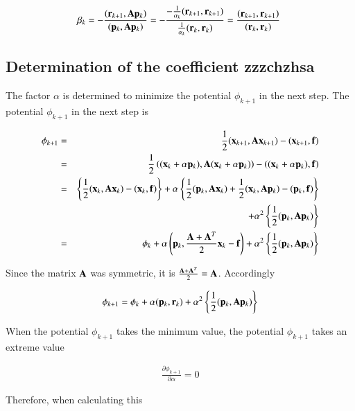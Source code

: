 \begin{equation}
\beta_k=-\frac{(\mathbf{r}_{k+1},\mathbf{A}\mathbf{p}_k)}{(\mathbf{p}_k,\mathbf{A}\mathbf{p}_k)}=-\frac{-\frac{1}{\alpha_k}(\mathbf{r}_{k+1},\mathbf{r}_{k+1})}{\frac{1}{\alpha_k}(\mathbf{r}_k,\mathbf{r}_k)}=\frac{(\mathbf{r}_{k+1},\mathbf{r}_{k+1})}{(\mathbf{r}_k,\mathbf{r}_k)}~
\end{equation}





\subsection{Determination of the coefficient zzzchzhsa}


The factor $\alpha$ is determined to minimize the potential $\phi_{k+1}$ in the next step.
The potential $\phi_{k+1}$ in the next step is

\begin{eqnarray}
\phi_{k+1} &=& \frac{1}{2}(\mathbf{x}_{k+1},\mathbf{A}\mathbf{x}_{k+1})-(\mathbf{x}_{k+1},\mathbf{f})\\
&=& \frac{1}{2}\left((\mathbf{x}_k+\alpha\mathbf{p}_k),\mathbf{A}(\mathbf{x}_k+\alpha\mathbf{p}_k)\right)-\left((\mathbf{x}_k+\alpha\mathbf{p}_k),\mathbf{f}\right)\\
&=& \left\{\frac{1}{2}(\mathbf{x}_k,\mathbf{A}\mathbf{x}_k)-(\mathbf{x}_k,\mathbf{f})\right\} + \alpha\left\{\frac{1}{2}(\mathbf{p}_k,\mathbf{A}\mathbf{x}_k)+\frac{1}{2}(\mathbf{x}_k,\mathbf{A}\mathbf{p}_k)-(\mathbf{p}_k,\mathbf{f})\right\}\\
&& + \alpha^2\left\{\frac{1}{2}(\mathbf{p}_k,\mathbf{A}\mathbf{p}_k)\right\}\\
&=& \phi_k+\alpha\left(\mathbf{p}_k,\frac{\mathbf{A}+\mathbf{A}^T}{2}\mathbf{x}_k-\mathbf{f}\right)+\alpha^2\left\{\frac{1}{2}(\mathbf{p}_k,\mathbf{A}\mathbf{p}_k)\right\}
\end{eqnarray}


Since the matrix $\mathbf{A}$ was symmetric, it is $\frac{\mathbf{A}+\mathbf{A}^T}{2}=\mathbf{A}$. Accordingly

\begin{eqnarray}
\phi_{k+1} = \phi_k+\alpha(\mathbf{p}_k,\mathbf{r}_k)+\alpha^2\left\{\frac{1}{2}(\mathbf{p}_k,\mathbf{A}\mathbf{p}_k)\right\}
\end{eqnarray}


When the potential $\phi_{k+1}$ takes the minimum value, the potential $\phi_{k+1}$ takes an extreme value

\begin{eqnarray}
\frac{\partial\phi_{k+1}}{\partial\alpha}=0
\end{eqnarray}


Therefore, when calculating this

